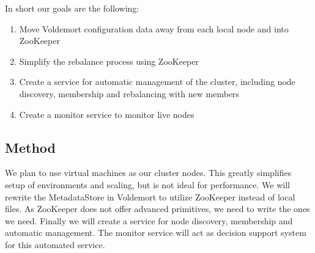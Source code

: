 
In short our goals are the following:

\begin{enumerate}
	\item{Move Voldemort configuration data away from each local node and into ZooKeeper}
	\item{Simplify the rebalance process using ZooKeeper}
	\item{Create a service for automatic management of the cluster, including node discovery, membership and rebalancing with new members}
	\item{Create a monitor service to monitor live nodes}
\end{enumerate}

\subsection{Method}
We plan to use virtual machines as our cluster nodes. This greatly simplifies setup of environments and scaling, but is not ideal for performance. We will rewrite the MetadataStore in Voldemort to utilize ZooKeeper instead of local files. As ZooKeeper does not offer advanced primitives, we need to write the ones we need. Finally we will create a service for node discovery, membership and automatic management. The monitor service will act as decision support system for this automated service. 






